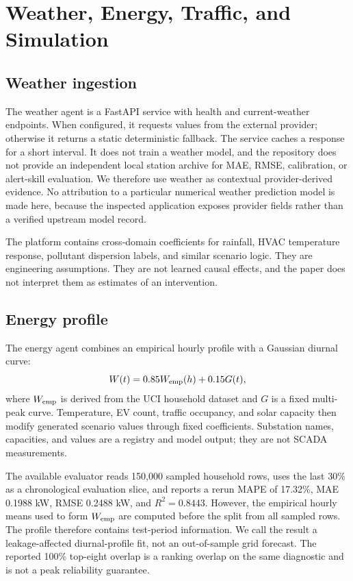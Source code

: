 \documentclass[conference]{IEEEtran}
\begin{document}
\section{Weather, Energy, Traffic, and Simulation}
\label{sec:otherdomains}
\subsection{Weather ingestion}
The weather agent is a FastAPI service with health and current-weather endpoints. When configured, it requests values from the external provider; otherwise it returns a static deterministic fallback. The service caches a response for a short interval. It does not train a weather model, and the repository does not provide an independent local station archive for MAE, RMSE, calibration, or alert-skill evaluation. We therefore use weather as contextual provider-derived evidence. No attribution to a particular numerical weather prediction model is made here, because the inspected application exposes provider fields rather than a verified upstream model record.

The platform contains cross-domain coefficients for rainfall, HVAC temperature response, pollutant dispersion labels, and similar scenario logic. They are engineering assumptions. They are not learned causal effects, and the paper does not interpret them as estimates of an intervention.

\subsection{Energy profile}
The energy agent combines an empirical hourly profile with a Gaussian diurnal curve:
\begin{equation}
 W(t)=0.85W_{\rm emp}(h)+0.15G(t),
\end{equation}
where $W_{\rm emp}$ is derived from the UCI household dataset and $G$ is a fixed multi-peak curve. Temperature, EV count, traffic occupancy, and solar capacity then modify generated scenario values through fixed coefficients. Substation names, capacities, and values are a registry and model output; they are not SCADA measurements.

The available evaluator reads 150,000 sampled household rows, uses the last 30\% as a chronological evaluation slice, and reports a rerun MAPE of 17.32\%, MAE 0.1988 kW, RMSE 0.2488 kW, and $R^2=0.8443$. However, the empirical hourly means used to form $W_{\rm emp}$ are computed before the split from all sampled rows. The profile therefore contains test-period information. We call the result a leakage-affected diurnal-profile fit, not an out-of-sample grid forecast. The reported 100\% top-eight overlap is a ranking overlap on the same diagnostic and is not a peak reliability guarantee.
\end{document}
